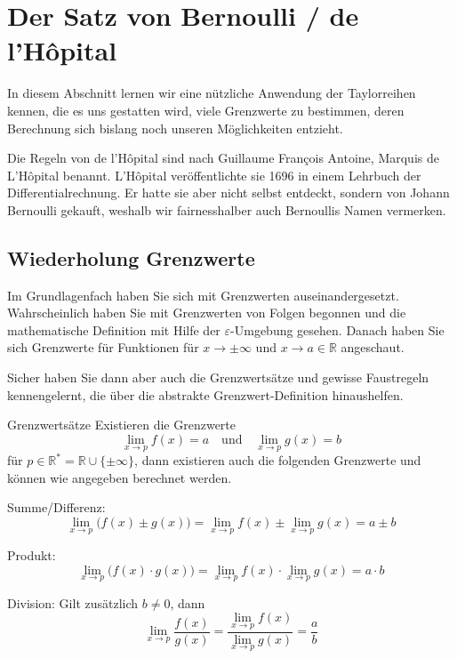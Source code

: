 \section{Der Satz von Bernoulli / de l’Hôpital}
In diesem Abschnitt lernen wir eine nützliche Anwendung der Taylorreihen kennen, die es uns gestatten wird, viele Grenzwerte zu bestimmen, deren Berechnung sich bislang noch unseren Möglichkeiten entzieht.

Die Regeln von de l'Hôpital sind nach Guillaume François Antoine, Marquis de L'Hôpital benannt. L'Hôpital veröffentlichte sie 1696 in einem Lehrbuch der Differentialrechnung. Er hatte sie aber nicht selbst entdeckt, sondern von Johann Bernoulli gekauft, weshalb wir fairnesshalber auch Bernoullis Namen vermerken.



\subsection{Wiederholung Grenzwerte}
Im Grundlagenfach haben Sie sich mit Grenzwerten auseinandergesetzt. Wahrscheinlich haben Sie mit Grenzwerten von Folgen begonnen und die mathematische Definition mit Hilfe der $\varepsilon$-Umgebung gesehen. Danach haben Sie sich Grenzwerte für Funktionen für $x \to \pm\infty$ und $x \to a \in \mathbb{R}$ angeschaut. %

Sicher haben Sie dann aber auch die Grenzwertsätze und gewisse Faustregeln kennengelernt, die über die abstrakte Grenzwert-Definition hinaushelfen.

\begin{satz}
    {Grenzwertsätze}{}
    Existieren die Grenzwerte 
\[
\lim\limits_{x \to p} f(x) = a \quad \text{und} \quad \lim\limits_{x \to p} g(x) = b
\]
für \( p \in \mathbb{R}^* = \mathbb{R} \cup \{\pm\infty\} \), dann existieren auch die folgenden Grenzwerte und können wie angegeben berechnet werden.

Summe/Differenz:
\[
\lim\limits_{x \to p} \big(f(x) \pm g(x)\big) = \lim\limits_{x \to p} f(x) \pm \lim\limits_{x \to p} g(x) = a \pm b
\]

Produkt:
\[
\lim\limits_{x \to p} \big(f(x) \cdot g(x)\big) = \lim\limits_{x \to p} f(x) \cdot \lim\limits_{x \to p} g(x) = a \cdot b
\]

Division:  
Gilt zusätzlich \( b \neq 0 \), dann
\[
\lim\limits_{x \to p} \frac{f(x)}{g(x)} = \frac{\lim\limits_{x \to p} f(x)}{\lim\limits_{x \to p} g(x)} = \frac{a}{b}
\]
\end{satz}

